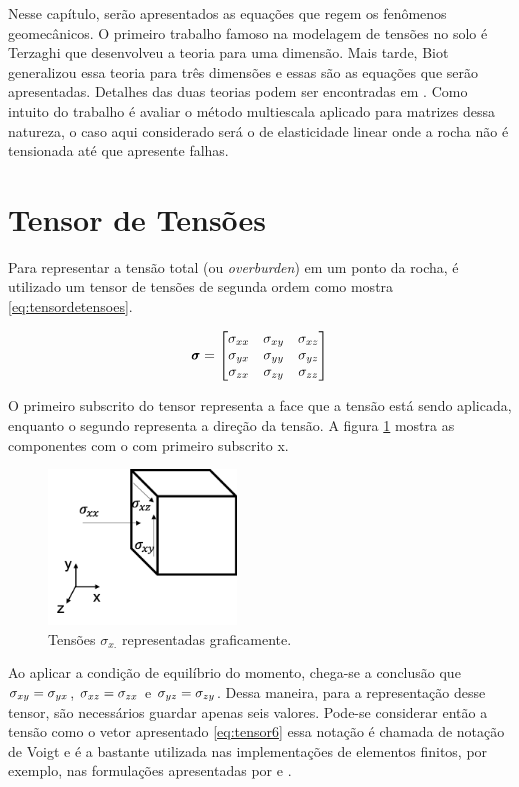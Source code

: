 
Nesse capítulo, serão apresentados as equações que regem os fenômenos geomecânicos. O primeiro trabalho famoso na modelagem de tensões no solo é Terzaghi que desenvolveu a teoria para uma dimensão. Mais tarde, Biot generalizou essa teoria para três dimensões e essas são as equações que serão apresentadas. Detalhes das duas teorias podem ser encontradas em \citet{CompGeomec}. Como intuito do trabalho é avaliar o método multiescala aplicado para matrizes dessa natureza, o caso aqui considerado será o de elasticidade linear onde a rocha não é tensionada até que apresente falhas.



\section{Tensor de Tensões}

Para representar a tensão total (ou \textit{overburden}) em um ponto da rocha, é utilizado um tensor de tensões de segunda ordem como mostra \eqref{eq:tensordetensoes}.

\begin{equation} \label{eq:tensordetensoes}
\mathbf{\pmb{\sigma}} =
    \begin{bmatrix}
    \sigma_{xx} & \sigma_{xy} & \sigma_{xz} \\
    \sigma_{yx} & \sigma_{yy} & \sigma_{yz} \\
    \sigma_{zx} & \sigma_{zy} & \sigma_{zz}
    \end{bmatrix}
\end{equation}

O primeiro subscrito do tensor representa a face que a tensão está sendo aplicada, enquanto o segundo representa a direção da tensão. A figura \ref{fig:tensoesx} mostra as componentes com o com primeiro subscrito x.


\begin{figure}[!htbp]
\centering
\includegraphics[width=5cm]{chap01/figs/tensor.png}
\caption{Tensões $\sigma_{x.}$ representadas graficamente.}
\label{fig:tensoesx}
\end{figure}

Ao aplicar a condição de equilíbrio do momento, chega-se a conclusão que $\sigma_{xy}=\sigma_{yx}$, $\sigma_{xz}=\sigma_{zx}$ e $\sigma_{yz}=\sigma_{zy}$. Dessa maneira, para a representação desse tensor, são necessários guardar apenas seis valores. Pode-se considerar então a tensão como o vetor apresentado \eqref{eq:tensor6} essa notação é chamada de notação de Voigt e é a bastante utilizada nas implementações de elementos finitos, por exemplo, nas formulações apresentadas por \citet{hughes} e \citet{jacob}.


